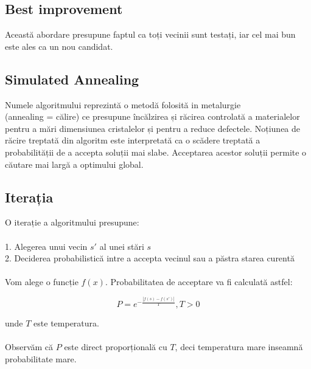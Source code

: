 \documentclass{article}
\begin{document}
\subsection*{Best improvement}
Această abordare presupune faptul ca toți vecinii sunt testați, iar cel mai bun este ales ca un nou candidat.

\subsection{Simulated Annealing}
Numele algoritmului reprezintă o metodă folosită in metalurgie \\(annealing = călire) ce presupune încălzirea și răcirea controlată a materialelor pentru a mări dimensiunea cristalelor și pentru a reduce defectele. Noțiunea de răcire treptată din algoritm este interpretată ca o scădere treptată a probabilității de a accepta soluții mai slabe. Acceptarea acestor soluții permite o căutare mai largă a optimului global.

\subsection*{Iterația}
O iterație a algoritmului presupune:\\\\
1. Alegerea unui vecin $s'$ al unei stări $s$\\
2. Deciderea probabilistică intre a accepta vecinul sau a păstra starea curentă\\\\

Vom alege o funcție $f(x)$. Probabilitatea de acceptare va fi calculată astfel:

$$ P = e^{- \frac{ | f(s) - f(s') |}{T}}, T > 0$$

unde $T$ este temperatura.\\\\

Observăm că $P$ este direct proporțională cu $T$, deci temperatura mare inseamnă probabilitate mare.
\end{document}
